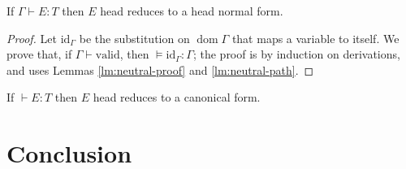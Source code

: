 \documentclass[a4paper,UKenglish]{lipics-v2016}
\newcommand*{\vald}{\ensuremath{\vdash \mathrm{valid}}}
\newcommand*{\dom}{\ensuremath{\operatorname{dom}}}
\theoremstyle{plain}
\begin{document}
\begin{corollary}
If $\Gamma \vdash E : T$ then $E$ head reduces to a head normal form.
\end{corollary}

\begin{proof}
Let $\mathrm{id}_\Gamma$ be the substitution on $\dom \Gamma$ that maps a variable to itself.
We prove that, if $\Gamma \vald$, then $\models \mathrm{id}_\Gamma : \Gamma$; the proof is by induction on derivations, and uses Lemmas \ref{lm:neutral-proof} and \ref{lm:neutral-path}.
\end{proof}

\begin{corollary}[Canonicity]
If $\vdash E : T$ then $E$ head reduces to a canonical form.
\end{corollary}

\section{Conclusion}


\end{document}
